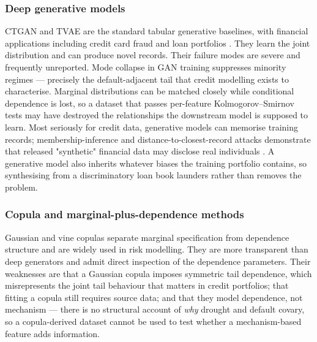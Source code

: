 \documentclass[journal]{IEEEtran}
\begin{document}
\subsubsection{Deep generative models}
CTGAN and TVAE \cite{xu2019ctgan} are the standard tabular generative baselines, with financial applications including credit card fraud and loan portfolios \cite{assefa2020synthetic}. They learn the joint distribution and can produce novel records. Their failure modes are severe and frequently unreported. Mode collapse in GAN training suppresses minority regimes --- precisely the default-adjacent tail that credit modelling exists to characterise. Marginal distributions can be matched closely while conditional dependence is lost, so a dataset that passes per-feature Kolmogorov--Smirnov tests may have destroyed the relationships the downstream model is supposed to learn. Most seriously for credit data, generative models can memorise training records; membership-inference and distance-to-closest-record attacks demonstrate that released "synthetic" financial data may disclose real individuals \cite{stadler2022synthetic,shokri2017membership}. A generative model also inherits whatever biases the training portfolio contains, so synthesising from a discriminatory loan book launders rather than removes the problem.

\subsubsection{Copula and marginal-plus-dependence methods}
Gaussian and vine copulas \cite{joe2014dependence} separate marginal specification from dependence structure and are widely used in risk modelling. They are more transparent than deep generators and admit direct inspection of the dependence parameters. Their weaknesses are that a Gaussian copula imposes symmetric tail dependence, which misrepresents the joint tail behaviour that matters in credit portfolios; that fitting a copula still requires source data; and that they model dependence, not mechanism --- there is no structural account of \emph{why} drought and default covary, so a copula-derived dataset cannot be used to test whether a mechanism-based feature adds information.
\end{document}
